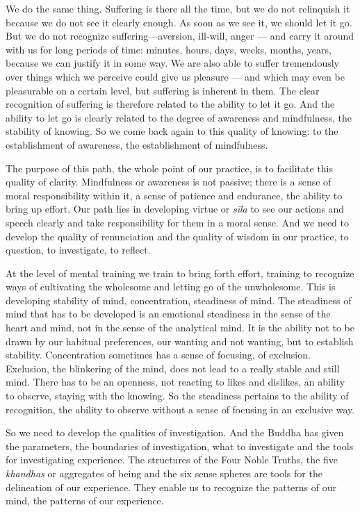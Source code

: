 We do the same thing. Suffering is there all the time, but we do not
relinquish it because we do not see it clearly enough. As soon as we see
it, we should let it go. But we do not recognize suffering---aversion,
ill-will, anger --- and carry it around with us for long periods of
time: minutes, hours, days, weeks, months, years, because we can justify
it in some way. We are also able to suffer tremendously over things
which we perceive could give us pleasure --- and which may even be
pleasurable on a certain level, but suffering is inherent in them. The
clear recognition of suffering is therefore related to the ability to
let it go. And the ability to let go is clearly related to the degree of
awareness and mindfulness, the stability of knowing. So we come back
again to this quality of knowing: to the establishment of awareness, the
establishment of mindfulness.

The purpose of this path, the whole point of our practice, is to
facilitate this quality of clarity. Mindfulness or awareness is not
passive; there is a sense of moral responsibility within it, a sense of
patience and endurance, the ability to bring up effort. Our path lies in
developing virtue or \emph{sīla} to see our actions and speech clearly
and take responsibility for them in a moral sense. And we need to
develop the quality of renunciation and the quality of wisdom in our
practice, to question, to investigate, to reflect.

At the level of mental training we train to bring forth effort, training
to recognize ways of cultivating the wholesome and letting go of the
unwholesome. This is developing stability of mind, concentration,
steadiness of mind. The steadiness of mind that has to be developed is
an emotional steadiness in the sense of the heart and mind, not in the
sense of the analytical mind. It is the ability not to be drawn by our
habitual preferences, our wanting and not wanting, but to establish
stability. Concentration sometimes has a sense of focusing, of
exclusion. Exclusion, the blinkering of the mind, does not lead to a
really stable and still mind. There has to be an openness, not reacting
to likes and dislikes, an ability to observe, staying with the knowing.
So the steadiness pertains to the ability of recognition, the ability to
observe without a sense of focusing in an exclusive way.

So we need to develop the qualities of investigation. And the Buddha has
given the parameters, the boundaries of investigation, what to
investigate and the tools for investigating experience. The structures
of the Four Noble Truths, the five \emph{khandhas} or aggregates of
being and the six sense spheres are tools for the delineation of our
experience. They enable us to recognize the patterns of our mind, the
patterns of our experience.

